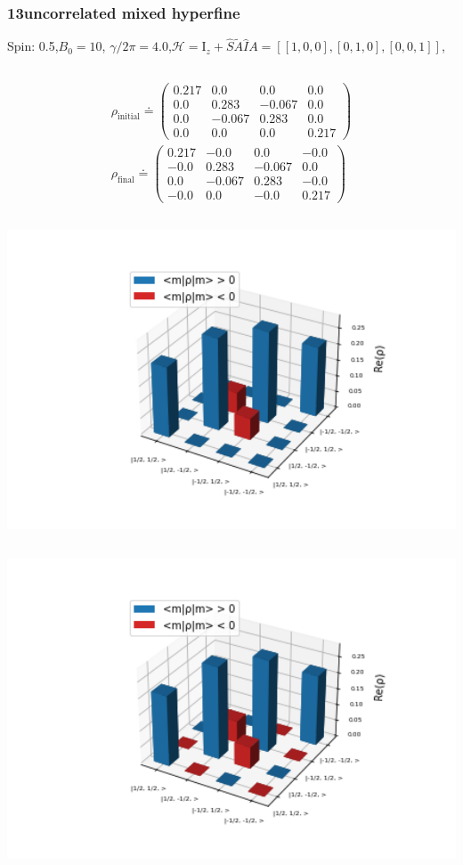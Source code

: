 \documentclass[10pt]{beamer}
\begin{document}
\begin{frame}
\frametitle{13uncorrelated mixed hyperfine}
Spin: 0.5,$B_0= 10$, $\gamma/2\pi = 4.0$,$\mathcal{H}=\text{I}_{z}+ \hat{S}\tilde{A}\hat{I}$$A=[[1, 0, 0], [0, 1, 0], [0, 0, 1]]$,
\begin{columns}[T]
\begin{column}{.5\textwidth}
\begin{align*}
\rho_{\text{initial}}\doteq
\begin{pmatrix}
0.217 & 0.0 & 0.0 & 0.0 \\
0.0 & 0.283 & -0.067 & 0.0 \\
0.0 & -0.067 & 0.283 & 0.0 \\
0.0 & 0.0 & 0.0 & 0.217
\end{pmatrix}
\\
\rho_{\text{final}}\doteq
\begin{pmatrix}
0.217 & -0.0 & 0.0 & -0.0 \\
-0.0 & 0.283 & -0.067 & 0.0 \\
0.0 & -0.067 & 0.283 & -0.0 \\
-0.0 & 0.0 & -0.0 & 0.217
\end{pmatrix}
\end{align*}
\begin{column}{.5\textwidth}
\includegraphics[width=1.5\textwidth]{./spin1-2/13uncorrelated_mixed_hyperfine/InitialRealPartDensityMatrix.png}
\end{column}
\begin{column}{.5\textwidth}
\includegraphics[width=1.5\textwidth]{./spin1-2/13uncorrelated_mixed_hyperfine/EvolvedRealPartDensityMatrix.png}

\end{column}
\end{column}
\end{columns}$$
\end{frame}
\end{document}
